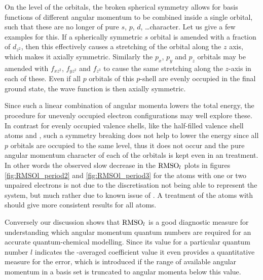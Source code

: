 On the level of the \SCF orbitals,
the broken spherical symmetry allows for \CS basis functions
of different angular momentum to be combined inside a single orbital,
such that these are no longer of pure
$s$, $p$, $d$, \ldots character.
Let us give a few examples for this.
If a spherically symmetric $s$ orbital is amended with
a fraction of $d_{z^2}$, then this effectively causes a stretching
of the orbital along the $z$ axis,
which makes it axially symmetric.
Similarly the $p_x$, $p_y$ and $p_z$ orbitals
may be amended with $f_{xz^2}$, $f_{yz^2}$ and $f_{z^3}$
to cause the same stretching along the $z$-axis in each of these.
Even if all $p$ orbitals of this $p$-shell are evenly occupied in the final \HF
ground state, the wave function is then axially symmetric.

Since such a linear combination of angular momenta lowers
the total \SCF energy,
the \UHF procedure for unevenly occupied electron configurations
may well explore these.
In contrast for evenly occupied valence shells,
like the half-filled valence shell atoms  and ,
such a symmetry breaking does not help to lower
the energy since all $p$ orbitals are occupied to the same level,
thus it does not occur
and the pure angular momentum character of each of the orbitals is kept
even in an \UHF treatment.
In other words the observed slow decrease in the $\text{RMSO}_l$ plots
in figures \ref{fig:RMSOl_period2} and \ref{fig:RMSOl_period3}
for the atoms with one or two unpaired electrons
is not due to the \CS discretisation not being able to represent the system,
but much rather due to known issue of \UHF.
A treatment of the atoms with \ROHF should give more consistent
results for all atoms.

%

Conversely our discussion shows that $\text{RMSO}_l$ is a good diagnostic measure
for understanding which angular momentum quantum numbers
are required for an accurate quantum-chemical modelling.
Since its value for a particular quantum number $l$ indicates
the \RMS-averaged coefficient value
it even provides a quantitative measure for the error,
which is introduced if the range of available angular momentum in a \CS basis set
is truncated to angular momenta below this value.

